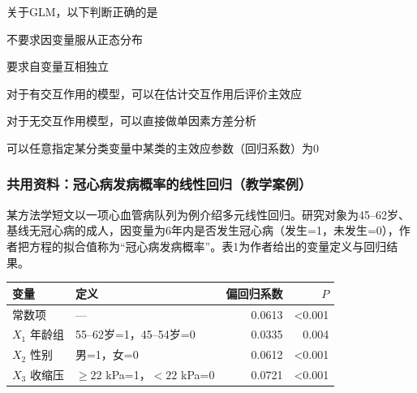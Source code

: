 \par\addvspace{6pt}\noindent\begin{minipage}{\linewidth}


关于GLM，以下判断正确的是


\begin{choices}

\item 不要求因变量服从正态分布

\item 要求自变量互相独立

\item 对于有交互作用的模型，可以在估计交互作用后评价主效应

\item 对于无交互作用模型，可以直接做单因素方差分析

\item 可以任意指定某分类变量中某类的主效应参数（回归系数）为0

\end{choices}

\end{minipage}\par\vspace{4pt}

\subsubsection*{共用资料：冠心病发病概率的线性回归（教学案例）}

某方法学短文以一项心血管病队列为例介绍多元线性回归。研究对象为45--62岁、基线无冠心病的成人，因变量为6年内是否发生冠心病（发生=1，未发生=0），作者把方程的拟合值称为``冠心病发病概率''。表1为作者给出的变量定义与回归结果。

\begin{center}\small\setlength{\tabcolsep}{4pt}\renewcommand{\arraystretch}{1.18}\begin{tabular}{@{}llrr@{}}
\toprule
变量 & 定义 & 偏回归系数 & \(P\) \\
\midrule
常数项 & --- & 0.0613 & \textless0.001 \\
\(X_1\) 年龄组 & 55--62岁=1，45--54岁=0 & 0.0335 & 0.004 \\
\(X_2\) 性别 & 男=1，女=0 & 0.0612 & \textless0.001 \\
\(X_3\) 收缩压 & \(\ge22\) kPa=1，\(<22\) kPa=0 & 0.0721 & \textless0.001 \\
\bottomrule\end{tabular}\end{center}

